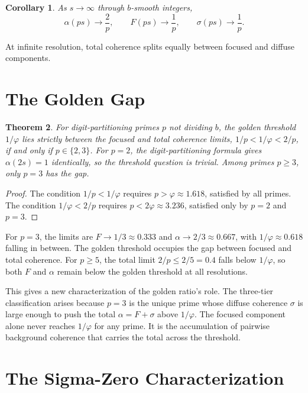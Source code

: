\documentclass[12pt]{amsart}
\newtheorem{theorem}{Theorem}
\newtheorem{corollary}[theorem]{Corollary}
\theoremstyle{definition}
\theoremstyle{remark}
\begin{document}
\begin{corollary}\label{cor:limits}
As $s \to \infty$ through $b$-smooth integers,
\[
\alpha(ps) \to \frac{2}{p}, \qquad
F(ps) \to \frac{1}{p}, \qquad
\sigma(ps) \to \frac{1}{p}.
\]
\end{corollary}

At infinite resolution, total coherence splits equally between
focused and diffuse components.

\section{The Golden Gap}

\begin{theorem}\label{thm:golden-gap}
For digit-partitioning primes $p$ not dividing $b$, the
golden threshold $1/\varphi$ lies strictly between the focused
and total coherence limits, $1/p < 1/\varphi < 2/p$, if and only
if $p \in \{2, 3\}$. For $p = 2$, the digit-partitioning
formula gives $\alpha(2s) = 1$ identically, so the
threshold question is trivial. Among primes $p \ge 3$,
only $p = 3$ has the gap.
\end{theorem}

\begin{proof}
The condition $1/p < 1/\varphi$ requires $p > \varphi \approx 1.618$,
satisfied by all primes. The condition $1/\varphi < 2/p$ requires
$p < 2\varphi \approx 3.236$, satisfied only by $p = 2$
and $p = 3$.
\end{proof}

For $p = 3$, the limits are $F \to 1/3 \approx 0.333$ and
$\alpha \to 2/3 \approx 0.667$, with $1/\varphi \approx 0.618$
falling in between. The golden threshold occupies the gap between
focused and total coherence. For $p \ge 5$, the total limit $2/p
\le 2/5 = 0.4$ falls below $1/\varphi$, so both $F$ and $\alpha$
remain below the golden threshold at all resolutions.

This gives a new characterization of the golden ratio's role. The
three-tier classification arises because $p = 3$ is the unique prime
whose diffuse coherence $\sigma$ is large enough to push the total
$\alpha = F + \sigma$ above $1/\varphi$. The focused component alone
never reaches $1/\varphi$ for any prime. It is the accumulation of
pairwise background coherence that carries the total across the
threshold.

\section{The Sigma-Zero Characterization}
\end{document}
